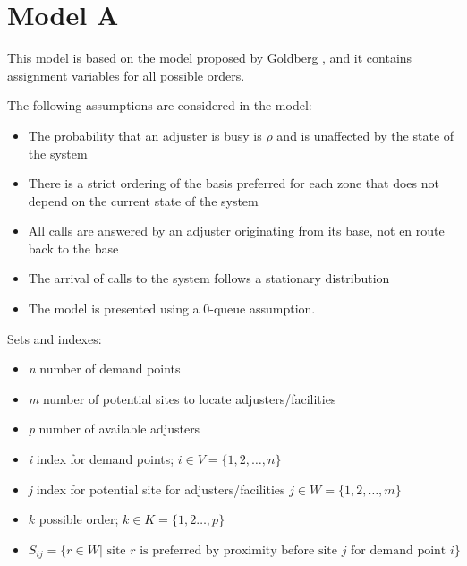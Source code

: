
\section{Model A}

This model is based
on the model
proposed by Goldberg \cite{goldberg1990validating},
and it contains assignment variables
for all possible orders.

The following assumptions are considered in the model:
\begin{itemize}
\item The probability that an adjuster is busy
  is $\rho$ and is unaffected by the state of the system
\item There is a strict ordering of the basis preferred for each zone
  that does not depend
  on the current state of the system
\item All calls are answered
  by an adjuster originating from its base,
  not en route back to the base
\item The arrival of calls to the system
  follows a stationary distribution
\item The model is presented
  using a 0-queue assumption.
\end{itemize}

Sets and indexes:
\begin{itemize}
\item \textit{n} number of demand points
\item \textit{m} number of potential sites to locate adjusters/facilities
\item \textit{p} number of available adjusters
\item \textit{i} index for demand points;
  $i \in V = \{1,2,\ldots,n\}$ 
\item \textit{j} index for potential site for adjusters/facilities
  $j \in W = \{1,2,\ldots,m\}$
\item $k$ possible order;
  $k \in K = \{1,2\ldots,p\}$
\item $S_{ij} = \{
  r \in W | \mbox{ site } r \mbox{ is preferred by proximity before site } j
  \mbox{ for demand point } i
  \}$
\end{itemize}

